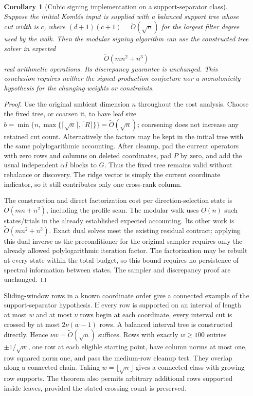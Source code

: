 \documentclass[11pt]{amsart}
\newtheorem{corollary}[theorem]{Corollary}
\theoremstyle{definition}\newtheorem{definition}[theorem]{Definition}
\theoremstyle{remark}\newtheorem{remark}[theorem]{Remark}
\numberwithin{equation}{section}
\begin{document}
\begin{corollary}[Cubic signing implementation on a support-separator class]
\label{ifc:cor:profilecubic}
Suppose the initial Koml\'os input is supplied with a balanced support tree
whose cut width is $c$, where $(d+1)(c+1)=\widetilde O(\sqrt n)$ for the
largest filter degree used by the walk. Then the modular signing algorithm
can use the constructed tree solver in expected
\[
                 \widetilde O(mn^2+n^3)
\]
real arithmetic operations. Its discrepancy guarantee is unchanged. This conclusion requires neither the signed-production conjecture
nor a monotonicity hypothesis for the changing weights or constraints.
\end{corollary}
\begin{proof}
Use the original ambient dimension $n$ throughout the cost analysis.
Choose the fixed tree, or coarsen it, to have leaf size
$b=\min\{n,\max\{\lceil\sqrt n\rceil,\lceil R\rceil\}\}
=\widetilde O(\sqrt n)$; coarsening does not increase any retained cut count.
Alternatively the factors may be kept in the initial tree with the same
polylogarithmic accounting. After cleanup, pad the current operators with
zero rows and columns on deleted coordinates, pad $P$ by zero, and add the
usual independent $\alpha I$ blocks to $G$. Thus the fixed tree remains
valid without rebalance or discovery. The ridge vector is simply the current
coordinate indicator, so it still contributes only one cross-rank column.

The construction and direct factorization cost per direction-selection state
is $\widetilde O(mn+n^2)$, including the profile scan. The modular walk uses
$\widetilde O(n)$ such states/trials in the already established expected
accounting. Its other work is
$\widetilde O(mn^2+n^3)$. Exact dual solves meet the existing residual
contract; applying this dual inverse as the preconditioner for the original
sampler requires only the already allowed polylogarithmic iteration factor.
The factorization may be rebuilt at every state within the total budget,
so this bound requires no persistence of spectral information between states. The sampler and discrepancy proof are unchanged.
\end{proof}

Sliding-window rows in a known coordinate order give a connected example
of the support-separator hypothesis. If every row is supported
on an interval of length at most $w$ and at most $\nu$ rows begin at each
coordinate, every interval cut is crossed by at most $2\nu(w-1)$ rows.
A balanced interval tree is constructed directly. Hence
$\nu w=\widetilde O(\sqrt n)$ suffices. Rows with exactly $w\ge100$ entries
$\pm1/\sqrt w$, one row at each eligible starting point, have column norms
at most one, row squared norm one, and pass the medium-row cleanup test.
They overlap along a connected chain. Taking $w=\lfloor\sqrt n\rfloor$
gives a connected class with growing row supports.
The theorem also permits arbitrary additional rows supported inside leaves,
provided the stated crossing count is preserved.
\end{document}
